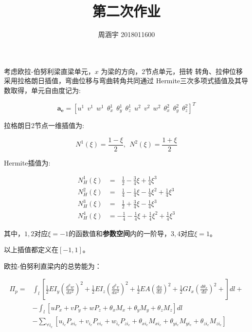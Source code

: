 \documentclass[UTF8,c5size]{ctexart}
\title{{\bfseries 第二次作业}}
\author{周涵宇 2018011600}
\date{}
\begin{document}
\maketitle

考虑欧拉-伯努利梁直梁单元，$x$ 为梁的方向，2节点单元，扭转
转角、拉伸位移采用拉格朗日插值，弯曲位移与弯曲转角共同通过
Hermite三次多项式插值及其导数取得，单元自由度记为:

\begin{equation}
\bm{a_e}=[u^1\ \ v^1\ \ w^1\ \ \theta^1_x\ \ \theta^1_y\ \ \theta^1_z
\ \ u^2\ \ v^2\ \ w^2\ \ \theta^2_x\ \ \theta^2_y\ \ \theta^2_z]^T
\end{equation}

拉格朗日2节点一维插值为:

\begin{equation}
N^1(\xi) = \frac{1-\xi}{2},\ \ N^2(\xi) = \frac{1+\xi}{2}
\end{equation}

Hermite插值为:

\begin{equation}
\begin{split}
N^1_H(\xi)&=\ \ \ \frac{1}{2}-\frac{3}{4}\xi+\frac{1}{4}\xi^3\\
N^2_H(\xi)&=\ \ \ \frac{1}{4}-\frac{1}{4}\xi-\frac{1}{4}\xi^2+\frac{1}{4}\xi^3\\
N^3_H(\xi)&=\ \ \ \frac{1}{2}+\frac{3}{4}\xi-\frac{1}{4}\xi^3\\
N^4_H(\xi)&=-\frac{1}{4}-\frac{1}{4}\xi+\frac{1}{4}\xi^2+\frac{1}{4}\xi^3
\end{split}
\end{equation}

其中，$1,2$对应$\xi=-1$的函数值和{\bfseries 参数空间}内的一阶导，$3,4$对应$\xi=1$。

以上插值都定义在$[-1,1]$。

欧拉-伯努利直梁内的总势能为：

\begin{equation}
    \begin{split}
        \Pi_p=
            &\int_{l}{\left[
            \frac{1}{2}EI_y\left(\frac{d^2w}{dx^2}\right)^2+
            \frac{1}{2}EI_z\left(\frac{d^2v}{dx^2}\right)^2+
            \frac{1}{2}EA\left(\frac{du}{dx}\right)^2+
            \frac{1}{2}GI_x\left(\frac{d\theta_x}{dx}\right)^2+            
            \right]dl}+\\
            &-\int_{l}{\left[
                uP_x+vP_y+wP_z+\theta_xM_x+\theta_yM_y+\theta_zM_z
                \right]dl}\\
            &-\sum_{\forall i_c}{\left[
            u_{i_c}P_{xi_c}+v_{i_c}P_{vi_c}+w_{i_c}P_{zi_c}
            +\theta_{xi_c}M_{xi_c}+\theta_{yi_c}M_{yi_c}+\theta_{zi_c}M_{zi_c}
            \right]}
    \end{split}
\end{equation}
\end{document}
